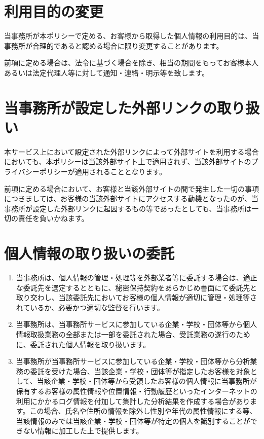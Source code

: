 \documentclass[a4j,titlepage]{ltjsarticle}
\begin{document}
\section{利用目的の変更}

当事務所が本ポリシーで定める、お客様から取得した個人情報の利用目的は、当事務所が合理的であると認める場合に限り変更することがあります。


前項に定める場合は、法令に基づく場合を除き、相当の期間をもってお客様本人あるいは法定代理人等に対して通知・連絡・明示等を致します。


\section{当事務所が設定した外部リンクの取り扱い}
本サービス上において設定された外部リンクによって外部サイトを利用する場合においても、本ポリシーは当該外部サイト上で適用されず、当該外部サイトのプライバシーポリシーが適用されることとなります。


前項に定める場合において、お客様と当該外部サイトの間で発生した一切の事項につきましては、お客様の当該外部サイトにアクセスする動機となったのが、当事務所が設定した外部リンクに起因するもの等であったとしても、当事務所は一切の責任を負いかねます。


\section{個人情報の取り扱いの委託}
\begin{enumerate}
	\item 当事務所は、個人情報の管理・処理等を外部業者等に委託する場合は、適正な委託先を選定するとともに、秘密保持契約をあらかじめ書面にて委託先と取り交わし、当該委託先においてお客様の個人情報が適切に管理・処理等されているか、必要かつ適切な監督を行います。
	\item 当事務所は、当事務所サービスに参加している企業・学校・団体等から個人情報取扱業務の全部または一部を委託された場合、受託業務の遂行のために、委託された個人情報を取り扱います。
	\item 当事務所が当事務所サービスに参加している企業・学校・団体等から分析業務の委託を受けた場合、当該企業・学校・団体等が指定したお客様を対象として、当該企業・学校・団体等から受領したお客様の個人情報に当事務所が保有するお客様の属性情報や位置情報・行動履歴といったインターネットの利用にかかるログ情報を付加して集計した分析結果を作成する場合があります。この場合、氏名や住所の情報を除外し性別や年代の属性情報にする等、当該情報のみでは当該企業・学校・団体等が特定の個人を識別することができない情報に加工した上で提供します。
\end{enumerate}
\end{document}
